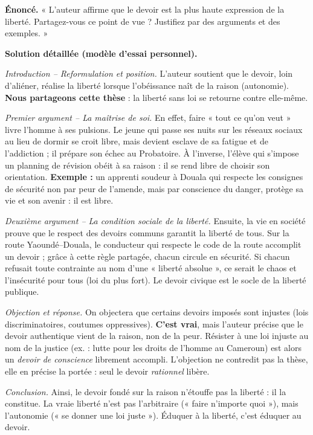 \documentclass[11pt]{article}
\newcommand{\cle}[1]{{\popxbold\color{popdark}#1}}
\begin{document}
\begin{exoresolu}
\textbf{Énoncé.} « L'auteur affirme que le devoir est la plus haute expression de la liberté. Partagez-vous ce point de vue ? Justifiez par des arguments et des exemples. »

\tcblower
\textbf{Solution détaillée (modèle d'essai personnel).}

\emph{Introduction -- Reformulation et position.} L'auteur soutient que le devoir, loin d'aliéner, réalise la liberté lorsque l'obéissance naît de la raison (autonomie). \textbf{Nous partageons cette thèse} : la liberté sans loi se retourne contre elle-même.

\emph{Premier argument -- La maîtrise de soi.} En effet, faire « tout ce qu'on veut » livre l'homme à ses pulsions. Le jeune qui passe ses nuits sur les réseaux sociaux au lieu de dormir se croit libre, mais devient esclave de sa fatigue et de l'addiction ; il prépare son échec au Probatoire. À l'inverse, l'élève qui s'impose un planning de révision obéit à sa raison : il se rend libre de choisir son orientation. \textbf{Exemple :} un apprenti soudeur à Douala qui respecte les consignes de sécurité non par peur de l'amende, mais par conscience du danger, protège sa vie et son avenir : il est libre.

\emph{Deuxième argument -- La condition sociale de la liberté.} Ensuite, la vie en société prouve que le respect des devoirs communs garantit la liberté de tous. Sur la route Yaoundé--Douala, le conducteur qui respecte le code de la route accomplit un devoir ; grâce à cette règle partagée, chacun circule en sécurité. Si chacun refusait toute contrainte au nom d'une « liberté absolue », ce serait le chaos et l'insécurité pour tous (loi du plus fort). Le devoir civique est le socle de la liberté publique.

\emph{Objection et réponse.} On objectera que certains devoirs imposés sont injustes (lois discriminatoires, coutumes oppressives). \textbf{C'est vrai}, mais l'auteur précise que le devoir authentique vient de la \cle{raison}, non de la \cle{peur}. Résister à une loi injuste au nom de la justice (ex. : lutte pour les droits de l'homme au Cameroun) est alors un \emph{devoir de conscience} librement accompli. L'objection ne contredit pas la thèse, elle en précise la portée : seul le devoir \emph{rationnel} libère.

\emph{Conclusion.} Ainsi, le devoir fondé sur la raison n'étouffe pas la liberté : il la constitue. La vraie liberté n'est pas l'arbitraire (« faire n'importe quoi »), mais l'autonomie (« se donner une loi juste »). Éduquer à la liberté, c'est éduquer au devoir.
\end{exoresolu}
\end{document}

